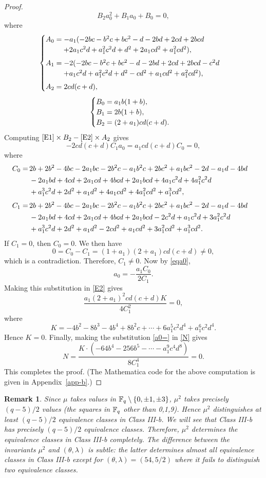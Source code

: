 \documentclass{amsart}
\newtheorem{rmk}[thm]{Remark}
\numberwithin{equation}{section}
\theoremstyle{definition}
\newcommand{\f}{\Bbb F}
\begin{document}
\begin{proof}
\begin{equation}
B_2a_0^2+B_1a_0+B_0=0,
\end{equation}
where
\[
\begin{cases}
A_0=-a_1 (-2 b c-b^2 c+b c^2-d-2 b d+2 c d+2 b c d\cr
\kern2.5em +2 a_1 c^2 d+a_1^2 c^2 d+d^2+2 a_1 c d^2+a_1^2 c d^2),\vspace{0.4em}\cr
A_1=-2 (-2 b c-b^2 c+b c^2-d-2 b d+2 c d+2 b c d-c^2 d\cr
\kern2.5em+a_1 c^2 d+a_1^2 c^2 d+d^2-c d^2+a_1 c d^2+a_1^2 c d^2),\vspace{0.4em}\cr
A_2=2 c d (c+d),
\end{cases}
\]
\[
\begin{cases}
B_0=a_1 b (1 + b),\cr
B_1= 2 b (1 + b),\cr
B_2= (2 + a_1) c d (c + d).
\end{cases}
\]
Computing $\eqref{E1}\times B_2-\eqref{E2}\times A_2$ gives
\begin{equation}\label{eqa0}
-2cd(c+d)C_1a_0=a_1cd(c+d)C_0=0,
\end{equation}
where 
\begin{align*}
C_0=\,&
2 b+2 b^2-4 b c-2 a_1 b c-2 b^2 c-a_1 b^2 c+2 b c^2+a_1 b c^2-2 d-a_1 d-4 b d\cr
&-2 a_1 b d+4 c d+2 a_1 c d+4 b c d+2 a_1 b c d+4 a_1 c^2 d+4 a_1^2 c^2 d\cr
&+a_1^3 c^2 d+2 d^2+a_1 d^2+4 a_1 c d^2+4 a_1^2 c d^2+a_1^3 c d^2,
\end{align*}
\begin{align*}  
C_1=\,&  
2 b+2 b^2-4 b c-2 a_1 b c-2 b^2 c-a_1 b^2 c+2 b c^2+a_1 b c^2-2 d-a_1 d-4 b d\cr
&-2 a_1 b d+4 c d+2 a_1 c d+4 b c d+2 a_1 b c d-2 c^2 d+a_1 c^2 d+3 a_1^2 c^2 d\cr
&+a_1^3 c^2 d+2 d^2+a_1 d^2-2 c d^2+a_1 c d^2+3 a_1^2 c d^2+a_1^3 c d^2.
\end{align*}
If $C_1=0$, then $C_0=0$. We then have
\[
0=C_0-C_1=(1+a_1) (2+a_1) c d (c+d)\ne 0,
\]
which is a contradiction. Therefore, $C_1\ne 0$. Now by \eqref{eqa0},
\begin{equation}\label{a0=}
a_0=-\frac{a_1C_0}{2C_1}.
\end{equation}
Making this substitution in \eqref{E2} gives 
\[
\frac{a_1 (2 + a_1)^2 c d (c + d)K}{4C_1^2}=0,
\]
where
\[
K=-4 b^2-8 b^3-4 b^4+8 b^2 c+\cdots +6 a_1^5 c^2 d^4+a_1^6 c^2 d^4.
\]
Hence $K=0$. Finally, making the substitution \eqref{a0=} in \eqref{N} gives
\[
N=\frac{K\cdot(-64b^4-256b^5-\cdots-a_1^9c^4d^8)}{8C_1^4}=0.
\]
This completes the proof. (The Mathematica code for the above computation is given in Appendix~\ref{app-b}.)
\end{proof}

\begin{rmk}\rm
Since $\mu$ takes values in $\f_q\setminus\{0,\pm1,\pm3\}$, $\mu^2$ takes precisely $(q-5)/2$ values (the squares in $\f_q$ other than 0,1,9). Hence $\mu^2$ distinguishes at least $(q-5)/2$ equivalence classes in Class III-b. We will see that Class III-b has precisely $(q-5)/2$ equivalence classes. Therefore, $\mu^2$ determines the equivalence classes in Class III-b completely. The difference between the invariants $\mu^2$ and $(\theta,\lambda)$ is subtle: the latter determines almost all equivalence classes in Class III-b except for $(\theta,\lambda)=(54,5/2)$ where it fails to distinguish two equivalence classes.
\end{rmk}
 
\end{document}
